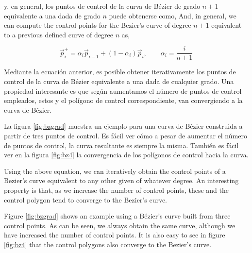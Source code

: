 \begin{paracol}{2}
y, en general, los puntos de control de la curva de Bézier de grado $n+1$ equivalente  a una dada de grado $n$ puede obtenerse como,
\switchcolumn
And, in general, we can compute the control points for the Bezier's curve of degree $n+1$ equivalent to a previous defined curve of degree $n$ as,
\end{paracol}
\begin{equation*}
\vec{p}_i^+ = \alpha_i\vec{p}_{i-1} + (1-\alpha_i)\vec{p}_i, \qquad \alpha_i =\frac{i}{n+1}
\end{equation*}
\begin{paracol}{2}
Mediante la ecuación anterior, es posible obtener iterativamente los puntos de control de la curva de Bézier equivalente a una dada de cualquier grado. Una propiedad interesante es que según aumentamos el número de puntos de control empleados, estos y el polígono de control correspondiente, van convergiendo a la curva de Bézier. 

La figura \ref{fig:bzgrad} muestra un ejemplo para una curva de Bézier construida a partir de tres puntos de control. Es fácil ver cómo a pesar de aumentar el número de puntos de control, la curva resultante es siempre la misma.  También es fácil ver en la figura \ref{fig:bz4} la convergencia de los polígonos de control hacia la curva.

\switchcolumn
Using the above equation, we can iteratively obtain the control points of a Bezier's curve equivalent to any other given of whatever degree. An interesting property is that, as we increase the number of control points, these and the control polygon tend to converge to the Bezier's curve.

Figure \ref{fig:bzgrad} shows an example using a Bézier's curve built from three control points. As can be seen, we always obtain the same curve, although we have increased the number of control points. It is also easy to see in figure \ref{fig:bz4} that the control polygons also converge to the Bezier's curve. 
\end{paracol}
